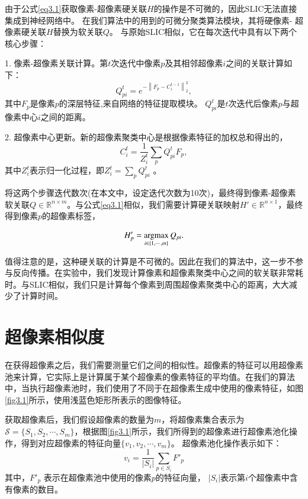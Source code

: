 由于公式\ref{eq3.1}获取像素-超像素硬关联$H$的操作是不可微的，因此SLIC无法直接集成到神经网络中。
在我们算法中的用到的可微分聚类算法模块，其将硬像素- 超像素硬关联$H$替换为软关联$Q$。
与原始SLIC相似，它在每次迭代中具有以下两个核心步骤：

1.	像素-超像素关联计算。第$t$次迭代中像素$p$及其相邻超像素$i$之间的关联计算如下：
\begin{equation}
Q_{pi}^{t} = e^{-\left \| F_{p}-C_{i}^{t-1}\right \|_2^2},
\end{equation}
其中\(F_{p}\)是像素$p$的深层特征,来自网络的特征提取模块。
$Q_{pi}^{t}$是$t$次迭代后像素$p$与超像素中心$i$之间的距离。

2.	超像素中心更新。新的超像素聚类中心是根据像素特征的加权总和得出的，
\begin{equation}
C_{i}^{t} = \frac{1}{Z_{i}^{t}}\sum_{p}Q_{pi}^{t}F_{p},
\label{eq3.3}
\end{equation}
其中$Z_{i}^{t}$表示归一化过程，即$Z_{i}^{t} = \sum\nolimits_{p}Q_{pi}^{t} $ 。

将这两个步骤迭代数次(在本文中，设定迭代次数为10次)，最终得到像素-超像素软关联\(Q\in\mathbb{R}^{n\times m}\)。与公式\ref{eq3.1}相似，我们需要计算硬关联映射$H'\in \mathbb{R}^{n\times 1}$，最终得到像素$p$的超像素标签，

\begin{equation}
H'_{p} =  \mathop{{{\rm argmax}}}\limits_{{i \in \left\{ 1, \cdots ,m \right\} }}Q_{pi}.
\label{eq3.4}
\end{equation}

值得注意的是，这种硬关联的计算是不可微的。因此在我们的算法中，这一步不参与反向传播。在实验中，我们发现计算像素和超像素聚类中心之间的软关联非常耗时。与SLIC相似，我们只是计算每个像素到周围超像素聚类中心的距离，大大减少了计算时间。

\section{超像素相似度}
在获得超像素之后，我们需要测量它们之间的相似性。超像素的特征可以用超像素池来计算，它实际上是计算属于某个超像素的像素特征的平均值。在我们的算法中，当执行超像素池时，我们使用了不同于在超像素生成中使用的像素特征，如图\ref{fig3.1}所示，使用浅蓝色矩形所表示的图像特征。

获取超像素后，我们假设超像素的数量为$m$，将超像素集合表示为$\mathcal{S}=\{S_{1},S_{2},\cdots ,S_{m}\}$，根据图\ref{fig3.1}所示，我们所得到的超像素进行超像素池化操作，得到对应超像素的特征向量$\{ v_{1},v_{2},\cdots,v_{m}\}$。 超像素池化操作表示如下：
\begin{equation}
v_{i} = \frac{1}{|S_{i}|}\sum_{p\in S_{i} }F'_{p}
\end{equation}
其中，$F'_{p}$ 表示在超像素池中使用的像素$p$的特征向量，
$|S_{i}|$表示第$i$个超像素中含有像素的数目。

